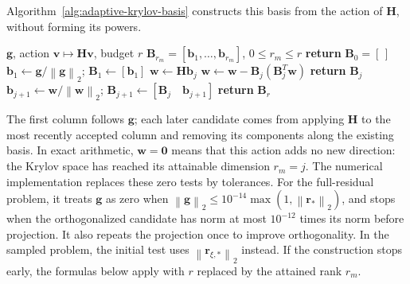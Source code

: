 \documentclass[11pt]{article}
\newcommand{\norm}[1]{\left\lVert #1 \right\rVert}
\begin{document}
Algorithm~\ref{alg:adaptive-krylov-basis} constructs this basis from
the action of $\mathbf H$, without forming its powers.
\begin{algorithm}[H]
\caption{Arnoldi construction of the adaptive secondary basis}
\label{alg:adaptive-krylov-basis}
\small
\begin{algorithmic}[1]
\Require $\mathbf g$, action $\mathbf v\mapsto\mathbf H\mathbf v$,
budget $r$
\Ensure $\mathbf B_{r_m}=[\mathbf b_1,\ldots,\mathbf b_{r_m}]$,
$0\leq r_m\leq r$
  \State \textbf{return} $\mathbf B_0=[\,]$
\EndIf
\State $\mathbf b_1\gets\mathbf g/\norm{\mathbf g}_2$;
$\mathbf B_1\gets[\mathbf b_1]$
  \State $\mathbf w\gets\mathbf H\mathbf b_j$
  \State $\mathbf w\gets\mathbf w-\mathbf B_j(\mathbf B_j^T\mathbf w)$
    \State \textbf{return} $\mathbf B_j$
  \EndIf
  \State $\mathbf b_{j+1}\gets\mathbf w/\norm{\mathbf w}_2$;
  $\mathbf B_{j+1}\gets[\mathbf B_j\quad\mathbf b_{j+1}]$
\EndFor
\State \textbf{return} $\mathbf B_r$
\end{algorithmic}
\end{algorithm}
The first column follows $\mathbf g$; each later candidate comes from
applying $\mathbf H$ to the most recently accepted column and removing
its components along the existing basis.  In exact arithmetic,
$\mathbf w=\mathbf0$ means that this action adds no new direction:
the Krylov space has reached its attainable dimension $r_m=j$.
The numerical implementation replaces these zero tests by tolerances.
For the full-residual problem, it treats $\mathbf g$ as zero when
$\norm{\mathbf g}_2\leq10^{-14}\max(1,\norm{\mathbf r_*}_2)$,
and stops when the orthogonalized candidate has norm at most
$10^{-12}$ times its norm before projection.  It also repeats the
projection once to improve orthogonality.  In the sampled problem,
the initial test uses $\norm{\mathbf r_{\xi,*}}_2$ instead.
If the construction stops early, the formulas below apply with
$r$ replaced by the attained rank $r_m$.
\end{document}
